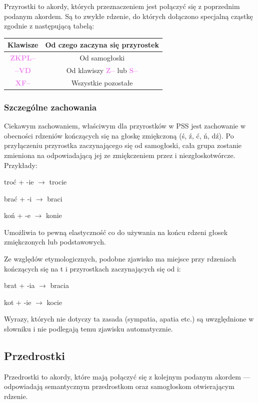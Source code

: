 \documentclass[12p, oneside]{book}
\newcommand{\steno}[1]{\textbf{\textsf{\textcolor{violet}{ #1}}}}
\begin{document}
Przyrostki to akordy, których przeznaczeniem jest połączyć się z poprzednim
podanym akordem. Są to zwykłe rdzenie, do których dołączono specjalną cząstkę
zgodnie z następującą tabelą:

\begin{tabular}{| c | c |}
	\hline
	Klawisze & Od czego zaczyna się przyrostek \\ \hline
	\steno{ZKPL--} & Od samogłoski \\ \hline
	\steno{--VD} & Od klawiszy \steno{Z--} lub \steno{S--} \\ \hline
	\steno{XF--} & Wszystkie pozostałe \\ \hline
\end{tabular}


\subsubsection{Szczególne zachowania}

Ciekawym zachowaniem, właściwym dla przyrostków w PSS jest zachowanie w
obecności rdzeniów kończących się na głoskę zmiękczoną (ś, ź, ć, ń, dź). Po
przyłączeniu przyrostka zaczynającego się od samogłoski, cała grupa zostanie
zmieniona na odpowiadającą jej ze zmiękczeniem przez i niezgłoskotwórcze.
Przykłady:

\begin{center}
troć + -ie $\rightarrow$ trocie
		
brać + -i $\rightarrow$ braci

koń + -e $\rightarrow$ konie
\end{center}

Umożliwia to pewną elastyczność co do używania na końcu rdzeni głosek
zmiękczonych lub podstawowych.

Ze względów etymologicznych, podobne zjawisko ma miejsce przy rdzeniach
kończących się na t i przyrostkach zaczynających się od i:

\begin{center}
brat + -ia $\rightarrow$ bracia

kot + -ie $\rightarrow$ kocie
\end{center}

Wyrazy, których nie dotyczy ta zasada (sympatia, apatia etc.) są uwzględnione w
słowniku i nie podlegają temu zjawisku automatycznie.

\newpage

\subsection{Przedrostki}
\label{ssec:przedrostki}
Przedrostki to akordy, które mają połączyć się z kolejnym podanym akordem ---
odpowiadają semantycznym przedrostkom oraz samogłoskom otwierającym rdzenie.
\end{document}
